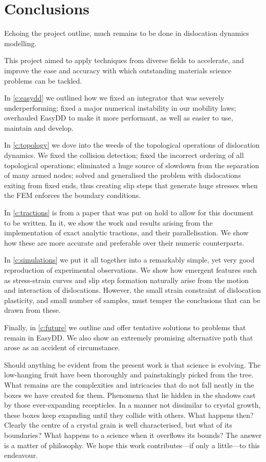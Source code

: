 \chapter{Conclusions}
\label{c:conclusions}

Echoing the project outline, much remains to be done in dislocation dynamics modelling.

This project aimed to apply techniques from diverse fields to accelerate, and improve the ease and accuracy with which outstanding materials science problems can be tackled.

In \cref{c:easydd} we outlined how we fixed an integrator that was severely underperforming; fixed a major numerical instability in our mobility laws; overhauled EasyDD to make it more performant, as well as easier to use, maintain and develop.

In \cref{c:topology} we dove into the weeds of the topological operations of dislocation dynamics. We fixed the collision detection; fixed the incorrect ordering of all topological operations; eliminated a huge source of slowdown from the separation of many armed nodes; solved and generalised the problem with dislocations exiting from fixed ends, thus creating slip steps that generate huge stresses when the FEM enforces the boundary conditions.

In \cref{c:tractions} is from a paper that was put on hold to allow for this document to be written. In it, we show the work and results arising from the implementation of exact analytic tractions, and their parallelisation. We show how these are more accurate and preferable over their numeric counterparts.

In \cref{c:simulations} we put it all together into a remarkably simple, yet very good reproduction of experimental observations. We show how emergent features such as stress-strain curves and slip step formation naturally arise from the motion and interaction of dislocations. However, the small strain constraint of dislocation plasticity, and small number of samples, must temper the conclusions that can be drawn from these.

Finally, in \cref{c:future} we outline and offer tentative solutions to problems that remain in EasyDD. We also show an extremely promising alternative path that arose as an accident of circumstance.

Should anything be evident from the present work is that science is evolving. The low-hanging fruit have been thoroughly and painstakingly picked from the tree. What remains are the complexities and intricacies that do not fall neatly in the boxes we have created for them. Phenomena that lie hidden in the shadows cast by those ever-expanding recepticles. In a manner not dissimilar to crystal growth, these boxes keep exapnding until they collide with others. What happens then? Clearly the centre of a crystal grain is well characterised, but what of its boundaries? What happens to a science when it overflows its bounds? The answer is a matter of philosophy. We hope this work contributes---if only a little---to this endeavour.
\savearabiccounter
